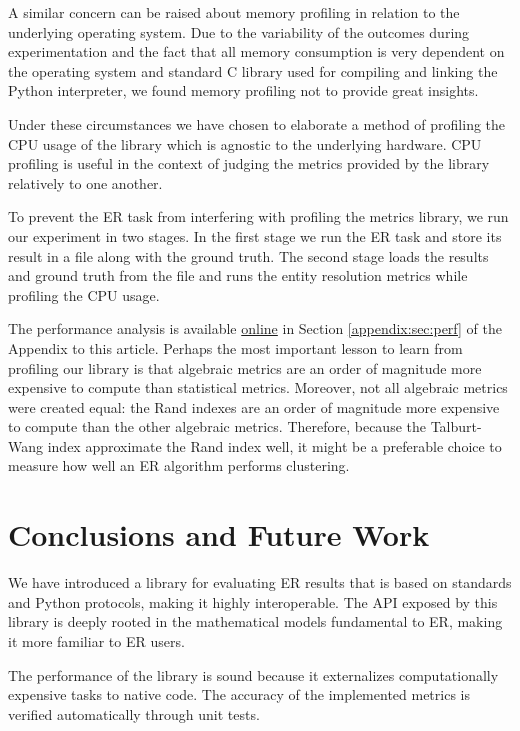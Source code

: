 \documentclass[a4paper,twoside]{article}
\newcommand{\appendixurl}{https://www.cs.ubbcluj.ro/~andrei.olar/article-data/er-metrics-library/02_appendix.pdf}
\begin{document}
    A similar concern can be raised about memory profiling in relation to the
    underlying operating system.
    Due to the variability of the outcomes during experimentation and the fact
    that all memory consumption is very dependent on the operating system and
    standard C library used for compiling and linking the Python interpreter,
    we found memory profiling not to provide great insights.

    Under these circumstances we have chosen to elaborate a method of profiling
    the CPU usage of the library which is agnostic to the underlying hardware.
    CPU profiling is useful in the context of judging the metrics provided by
    the library relatively to one another.

    To prevent the ER task from interfering with profiling the metrics library,
    we run our experiment in two stages.
    In the first stage we run the ER task and store its result in a file along
    with the ground truth.
    The second stage loads the results and ground truth from the file and runs
    the entity resolution metrics while profiling the CPU usage.

    The performance analysis is available \href{\appendixurl}{online} in Section
    \ref{appendix:sec:perf} of the Appendix to this article.
    Perhaps the most important lesson to learn from profiling our library is
    that algebraic metrics are an order of magnitude more expensive to compute
    than statistical metrics.
    Moreover, not all algebraic metrics were created equal: the Rand indexes
    are an order of magnitude more expensive to compute than the other algebraic
    metrics.
    Therefore, because the Talburt-Wang index approximate the Rand index well,
    it might be a preferable choice to measure how well an ER algorithm performs
    clustering.

    \section{Conclusions and Future Work}\label{sec:conclusions_and_future}

    We have introduced a library for evaluating ER results that
    is based on standards and Python protocols, making it highly interoperable.
    The API exposed by this library is deeply rooted in the mathematical models
    fundamental to ER, making it more familiar to ER users.

    The performance of the library is sound because it externalizes
    computationally expensive tasks to native code.
    The accuracy of the implemented metrics is verified automatically through
    unit tests.
\end{document}
